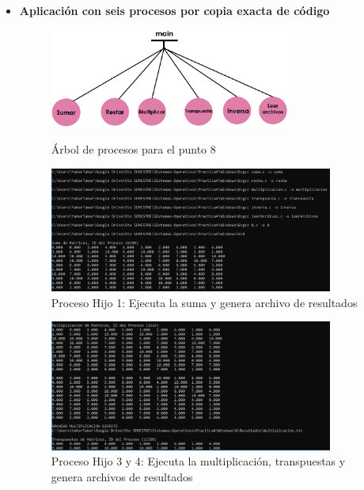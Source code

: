 \documentclass[12pt]{article}
\begin{document}
\begin{itemize}
\begin{itemize}
\begin{figure}[h!]
                        
                    \end{figure}
                    

                    
                    \item \textbf{Aplicación con seis procesos por copia exacta de código}
                         \begin{figure}[h!]
                        \centering
                        \includegraphics[width=0.75\textwidth]{Practica4/Images/Windows/arbol8.PNG}
                        \caption{Árbol de procesos para el punto 8}
                        \includegraphics[width=0.88\textwidth]{Practica4/Images/Windows/8_1.PNG}
                        \caption{Proceso Hijo 1: Ejecuta la suma y genera archivo de resultados}
                        

                    \end{figure}
                \newpage
                    \begin{figure}[h!]
                        \centering
                         \includegraphics[width=0.88\textwidth]{Practica4/Images/Windows/8_3.PNG}
                        \caption{Proceso Hijo 3 y 4: Ejecuta la multiplicación, transpuestas y genera archivos de resultados}
                        

\end{figure}
\end{itemize}
\end{itemize}
\end{document}
